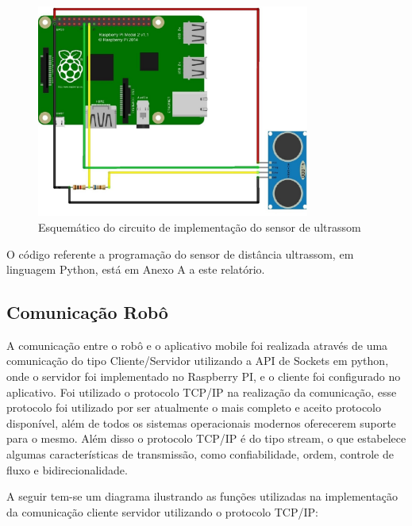 \begin{figure}[H]
    \centering
    \includegraphics[width=0.8\textwidth]{figuras/esquematico_ultrassom.eps}
    \caption{Esquemático do circuito de implementação do sensor de ultrassom}
    \label{fig:catia01}
\end{figure}

O código referente a programação do sensor de distância ultrassom, em linguagem Python, está em Anexo A a este relatório.

\subsection{Comunicação Robô}

A comunicação entre o robô e o aplicativo mobile foi realizada através de uma comunicação do tipo Cliente/Servidor utilizando a API de Sockets em python, onde o servidor foi implementado no Raspberry PI, e o cliente foi configurado no aplicativo. Foi utilizado o protocolo TCP/IP na realização da comunicação, esse protocolo foi utilizado por ser atualmente o mais completo e aceito protocolo disponível, além de todos os sistemas operacionais modernos oferecerem suporte para o mesmo. Além disso o protocolo TCP/IP é do tipo stream, o que estabelece algumas características de transmissão, como confiabilidade, ordem, controle de fluxo e bidirecionalidade.

A seguir tem-se um diagrama ilustrando as funções utilizadas na implementação da comunicação cliente servidor utilizando o protocolo TCP/IP:

